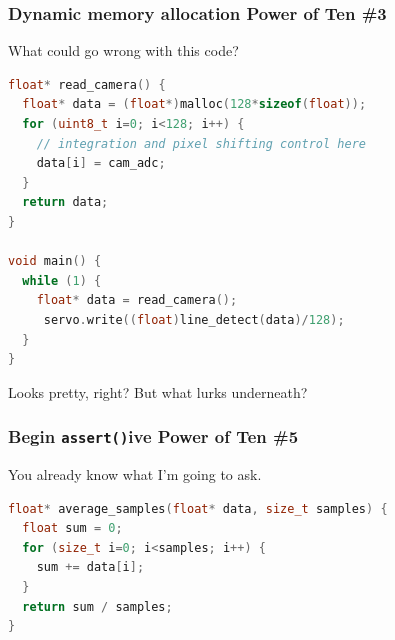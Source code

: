 \documentclass{beamer}
\begin{document}
\begin{frame} [fragile]
\frametitle{Dynamic memory allocation \small{Power of Ten \#3}}
What could go wrong with this code?
\begin{lstlisting}[language=C++,basicstyle=\ttfamily\tiny]
float* read_camera() {
  float* data = (float*)malloc(128*sizeof(float));
  for (uint8_t i=0; i<128; i++) {
    // integration and pixel shifting control here
    data[i] = cam_adc;
  }
  return data;
}

void main() {
  while (1) {
    float* data = read_camera();
     servo.write((float)line_detect(data)/128); 
  }
}
\end{lstlisting}
Looks pretty, right? But what lurks underneath? \\
\end{frame}


\begin{frame} [fragile]
\frametitle{Begin \texttt{assert()}ive \small{Power of Ten \#5}}
You already know what I'm going to ask.
\begin{lstlisting}[language=C++,basicstyle=\ttfamily\tiny]
float* average_samples(float* data, size_t samples) {
  float sum = 0;
  for (size_t i=0; i<samples; i++) {
    sum += data[i];
  }
  return sum / samples;
}
\end{lstlisting}
\end{frame}
\end{document}
